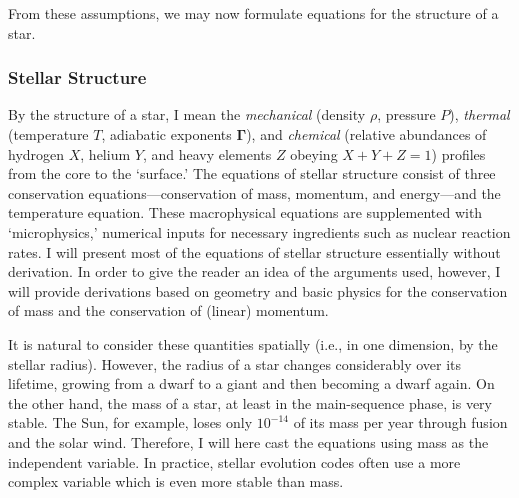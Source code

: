 \begin{enumerate}
\end{enumerate}
From these assumptions, we may now formulate equations for the structure of a star. 

\subsubsection*{Stellar Structure}
By the structure of a star, I mean the \emph{mechanical} (density $\rho$, pressure $P$), \emph{thermal} (temperature $T$, adiabatic exponents $\boldsymbol\Gamma$), and \emph{chemical} (relative abundances of hydrogen $X$, helium $Y$, and heavy elements $Z$ obeying ${X+Y+Z=1}$) profiles from the core to the `surface.' 
The equations of stellar structure consist of three conservation equations---conservation of mass, momentum, and energy---and the temperature equation. 
These macrophysical equations are supplemented with `microphysics,' numerical inputs for necessary ingredients such as nuclear reaction rates. 
I will present most of the equations of stellar structure essentially without derivation. 
In order to give the reader an idea of the arguments used, however, I will provide derivations based on geometry and basic physics for the conservation of mass and the conservation of (linear) momentum. 

It is natural to consider these quantities spatially (i.e., in one dimension, by the stellar radius). 
However, the radius of a star changes considerably over its lifetime, growing from a dwarf to a giant and then becoming a dwarf again. 
On the other hand, the mass of a star, at least in the main-sequence phase, is very stable. 
The Sun, for example, loses only $10^{-14}$ of its mass per year through fusion and the solar wind. 
Therefore, I will here cast the equations using mass as the independent variable. 
In practice, stellar evolution codes often use a more complex variable which is even more stable than mass. 

